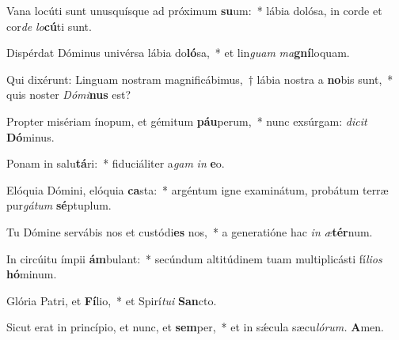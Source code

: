 \item Vana locúti sunt unusquísque ad próximum \textbf{su}um:~* lábia dolósa, in corde et cor\textit{de} \textit{lo}\textbf{cú}ti sunt.
\item Dispérdat Dóminus univérsa lábia do\textbf{ló}sa,~* et lin\textit{guam} \textit{ma}\textbf{gní}loquam.
\item Qui dixérunt: Linguam nostram magnificábimus,~† lábia nostra a \textbf{no}bis sunt,~* quis noster \textit{Dómi}\textbf{nus} est?
\item Propter misériam ínopum, et gémitum \textbf{páu}perum,~* nunc exsúrgam: \textit{dicit} \textbf{Dó}minus.
\item Ponam in salu\textbf{tá}ri:~* fiduciáliter a\textit{gam} \textit{in} \textbf{e}o.
\item Elóquia Dómini, elóquia \textbf{ca}sta:~* argéntum igne examinátum, probátum terræ pur\textit{gátum} \textbf{sé}ptuplum.
\item Tu Dómine servábis nos et custódi\textbf{es} nos,~* a generatióne hac \textit{in} \textit{æ}\textbf{tér}num.
\item In circúitu ímpii \textbf{ám}bulant:~* secúndum altitúdinem tuam multiplicásti fí\hspace{0.02em}\textit{lios} \textbf{hó}minum.
\item Glória Patri, et \textbf{Fí}lio,~* et Spirí\tinyhspace\textit{tui} \textbf{San}cto.
\item Sicut erat in princípio, et nunc, et \textbf{sem}per,~* et in sǽcula sæcu\tinyhspace\textit{lórum.} \textbf{A}men.
